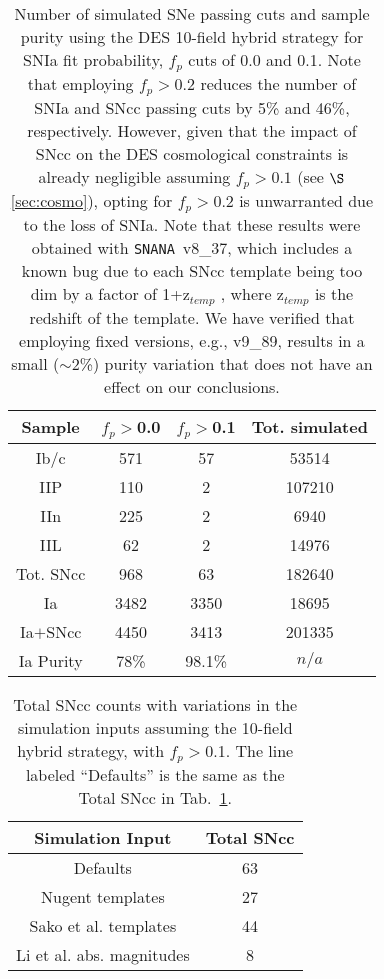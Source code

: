 \documentclass[preprint2]{aastex}    %
\newcommand{\snana}{{\tt SNANA}}
\begin{document}
\begin{table}[h]
\centering%
\begin{tabular}
[c]{|c|c|c|c|}\hline
Sample & $f_p>$0.0 & $f_p>$0.1 & Tot. simulated\\
\hline
Ib/c       & 571 &   57 & 53514\\
IIP       &  110 &   2 & 107210\\
IIn       &  225 &   2 & 6940\\
IIL       &  62 &   2 & 14976\\
\hline
Tot. SNcc  &  968 & 63 & 182640\\
\hline
Ia        & 3482 & 3350 & 18695\\
\hline
Ia$+$SNcc  &  4450 & 3413 & 201335\\
\hline
Ia Purity &  78\% &    98.1\% & $n/a$ \\
\hline
\end{tabular}
\caption{Number of simulated SNe passing cuts and sample purity using 
the DES 10-field hybrid strategy for SNIa fit probability, $f_p$ cuts of 0.0 
and 0.1. Note that employing $f_p>0.2$ reduces the number of SNIa and SNcc 
passing cuts by 5\% and 46\%, respectively. However, given that the impact of 
SNcc on the DES cosmological constraints is already negligible assuming 
$f_p>0.1$ (see $\S$\ref{sec:cosmo}), opting for $f_p>0.2$ 
is unwarranted due to the loss of SNIa. Note that these results 
were obtained with \snana\ v8\_37, which includes a known bug 
due to each SNcc template being too dim by a factor of 1+z$_{temp}$ 
\citep[see $\S$2.6 of][]{SNchall}, where z$_{temp}$ is the redshift of the template. 
We have verified that employing 
fixed versions, e.g., v9\_89, results in a small ($\sim$2\%) purity 
variation that does not have an effect on 
our conclusions.}
\label{tab:ccnum1gauss}%
\end{table}

\begin{table}[h]
\centering%
\begin{tabular}
[c]{|c|c|}\hline
Simulation Input & Total SNcc\\
\hline
Defaults & 63 \\
Nugent templates & 27 \\
Sako et al. templates & 44 \\
Li et al. abs. magnitudes & 8\\
\hline
\end{tabular}
\caption{Total SNcc counts with variations in the simulation inputs assuming the 10-field
hybrid strategy, with $f_p>$0.1. The line labeled ``Defaults'' is the same as the Total SNcc in 
Tab.~\ref{tab:ccnum1gauss}.}
\label{tab:cccompare}%
\end{table}
\end{document}
